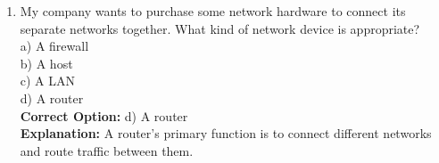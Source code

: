 \documentclass[a4paper,12pt]{article}
\begin{document}
\begin{enumerate}
    \textbf{Correct Option:} c) A client\\
    \textbf{Explanation:} My device is requesting and receiving data from YouTube's servers, which makes it a client.\\

    \item My company wants to purchase some network hardware to connect its separate networks together. What kind of network device is appropriate?\\
    a) A firewall\\
    b) A host\\
    c) A LAN\\
    d) A router\\

    \textbf{Correct Option:} d) A router\\
    \textbf{Explanation:} A router's primary function is to connect different networks and route traffic between them.\\
\end{enumerate}
\end{document}
